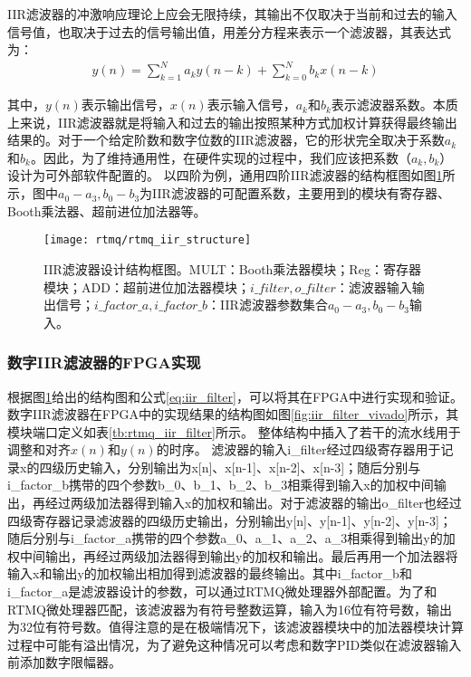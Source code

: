 IIR滤波器的冲激响应理论上应会无限持续，其输出不仅取决于当前和过去的输入信号值，也取决于过去的信号输出值，用差分方程来表示一个滤波器，其表达式为：
\begin{align}
    y(n)=\sum_{k=1}^Na_ky(n-k)+\sum_{k=0}^Nb_kx(n-k)\label{eq:iir_filter}
\end{align}


其中，$y(n)$表示输出信号，$x(n)$表示输入信号，$a_k$和$b_k$表示滤波器系数。本质上来说，IIR滤波器就是将输入和过去的输出按照某种方式加权计算获得最终输出结果的。对于一个给定阶数和数字位数的IIR滤波器，它的形状完全取决于系数$a_k$和$b_k$。因此，为了维持通用性，在硬件实现的过程中，我们应该把系数（$a_k, b_k$）设计为可外部软件配置的。
以四阶为例，通用四阶IIR滤波器的结构框图如图\ref{fig:rtmq_iir_structure}所示，图中$a_0-a_3, b_0-b_3$为IIR滤波器的可配置系数，主要用到的模块有寄存器、Booth乘法器、超前进位加法器等。
\begin{figure}
    \centering
    \caption[IIR滤波器设计结构框图]{IIR滤波器设计结构框图。MULT：Booth乘法器模块；Reg：寄存器模块；ADD：超前进位加法器模块；$i\_filter, o\_filter$：滤波器输入输出信号；$i\_factor\_a,i\_factor\_b$：IIR滤波器参数集合$a_0-a_3, b_0-b_3$输入。\label{fig:rtmq_iir_structure}}
    \texttt{[image: rtmq/rtmq\_iir\_structure]}
\end{figure}


\subsubsection[高速通用数字IIR滤波器的FPGA实现]{数字IIR滤波器的FPGA实现}

根据图\ref{fig:rtmq_iir_structure}给出的结构图和公式\eqref{eq:iir_filter}，可以将其在FPGA中进行实现和验证。数字IIR滤波器在FPGA中的实现结果的结构图如图\ref{fig:iir_filter_vivado}所示，其模块端口定义如表\ref{tb:rtmq_iir_filter}所示。
整体结构中插入了若干的流水线用于调整和对齐$x(n)$和$y(n)$的时序。
滤波器的输入i\_filter经过四级寄存器用于记录x的四级历史输入，分别输出为x[n]、x[n-1]、x[n-2]、x[n-3]；随后分别与i\_factor\_b携带的四个参数b\_0、b\_1、b\_2、b\_3相乘得到输入x的加权中间输出，再经过两级加法器得到输入x的加权和输出。对于滤波器的输出o\_filter也经过四级寄存器记录滤波器的四级历史输出，分别输出y[n]、y[n-1]、y[n-2]、y[n-3]；随后分别与i\_factor\_a携带的四个参数a\_0、a\_1、a\_2、a\_3相乘得到输出y的加权中间输出，再经过两级加法器得到输出y的加权和输出。最后再用一个加法器将输入x和输出y的加权输出相加得到滤波器的最终输出。其中i\_factor\_b和i\_factor\_a是滤波器设计的参数，可以通过RTMQ微处理器外部配置。为了和RTMQ微处理器匹配，该滤波器为有符号整数运算，输入为16位有符号数，输出为32位有符号数。值得注意的是在极端情况下，该滤波器模块中的加法器模块计算过程中可能有溢出情况，为了避免这种情况可以考虑和数字PID类似在滤波器输入前添加数字限幅器。

